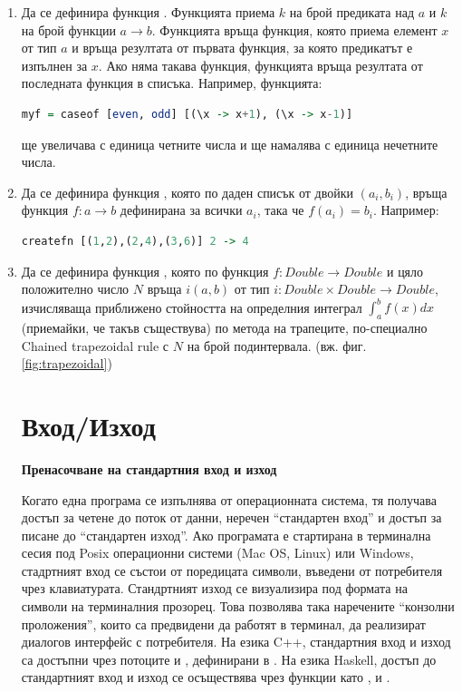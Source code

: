 \begin{enumerate}[]
	\item Да се дефинира функция . Функцията приема $k$ на брой предиката над $a$ и $k$ на брой функции $a\rightarrow b$. Функцията  връща функция, която приема елемент $x$ от тип $a$ и връща резултата от първата функция, за която предикатът е изпълнен за $x$. Ако няма такава функция, функцията връща резултата от последната функция в списъка. Например, функцията:
\begin{lstlisting}[basicstyle=\small,language=Haskell]
myf = caseof [even, odd] [(\x -> x+1), (\x -> x-1)]
\end{lstlisting}
	ще увеличава с единица четните числа и ще намалява с единица нечетните числа.
		
	\item   Да се дефинира функция , която по даден списък от двойки $(a_i,b_i)$, връща функция $f:a \rightarrow b$ дефинирана за всички $a_i$, така че $f(a_i)=b_i$. Например:

\begin{lstlisting}[basicstyle=\small,language=Haskell]
createfn [(1,2),(2,4),(3,6)] 2 -> 4
\end{lstlisting}

\item Да се дефинира функция , която по функция $f: Double \rightarrow Double$ и цяло положително число $N$ връща $i(a,b)$ от тип $i:Double \times Double \rightarrow Double$, изчисляваща приближено стойността на определния интеграл $\int_{a}^{b} f(x) dx$ (приемайки, че такъв съществува) по метода на трапеците, по-специално Chained trapezoidal rule\cite{trapezoidal} с $N$ на брой подинтервала. (вж. фиг. \ref{fig:trapezoidal})

\section {Вход/Изход}


\begin{mdframed}[hidealllines=true,backgroundcolor=gray!20]
\textbf{Пренасочване на стандартния вход и изход}

Когато една програма се изпълнява от операционната система, тя получава достъп за четене до поток от данни, неречен ``стандартен вход'' и достъп за писане до ``стандартен изход''. Ако програмата е стартирана в терминална сесия под Posix операционни системи (Mac OS, Linux) или Windows, стадртният вход се състои от поредицата символи, въведени от потребителя чрез клавиатурата. Стандртният изход се визуализира под формата на символи на терминалния прозорец. Това позволява така наречените ``конзолни проложения'', които са предвидени да работят в терминал, да реализират диалогов интерфейс с потребителя. На езика C++, стандартния вход и изход са достъпни чрез потоците  и , дефинирани в . На езика Haskell, достъп до стандартният вход и изход се осъществява чрез функции като ,  и .


\end{mdframed}
\end{enumerate}
